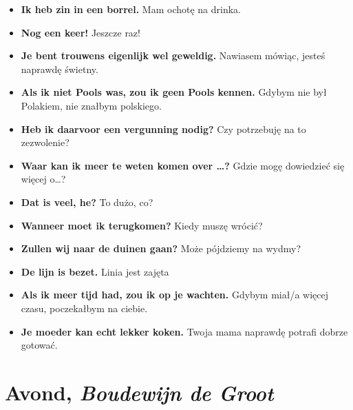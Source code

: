\documentclass[
]{book}
\providecommand{\tightlist}{%
  \setlength{\itemsep}{0pt}\setlength{\parskip}{0pt}}
\begin{document}
\begin{itemize}
\tightlist
\item
  \textbf{Ik heb zin in een borrel.} Mam ochotę na drinka.\\
\item
  \textbf{Nog een keer!} Jeszcze raz!\\
\item
  \textbf{Je bent trouwens eigenlijk wel geweldig.} Nawiasem mówiąc, jesteś naprawdę świetny.\\
\item
  \textbf{Als ik niet Pools was, zou ik geen Pools kennen.} Gdybym nie był Polakiem, nie znałbym polskiego.\\
\item
  \textbf{Heb ik daarvoor een vergunning nodig?} Czy potrzebuję na to zezwolenie?\\
\item
  \textbf{Waar kan ik meer te weten komen over \ldots?} Gdzie mogę dowiedzieć się więcej o\ldots?\\
\item
  \textbf{Dat is veel, he?} To dużo, co?\\
\item
  \textbf{Wanneer moet ik terugkomen?} Kiedy muszę wrócić?\\
\item
  \textbf{Zullen wij naar de duinen gaan?} Może pójdziemy na wydmy?\\
\item
  \textbf{De lijn is bezet.} Linia jest zajęta\\
\item
  \textbf{Als ik meer tijd had, zou ik op je wachten.} Gdybym miał/a więcej czasu, poczekałbym na ciebie.\\
\item
  \textbf{Je moeder kan echt lekker koken.} Twoja mama naprawdę potrafi dobrze gotować.
\end{itemize}

\hypertarget{Avond}{%
\section{\texorpdfstring{Avond, \emph{Boudewijn de Groot}}{Avond, Boudewijn de Groot}}\label{Avond}}
\end{document}
